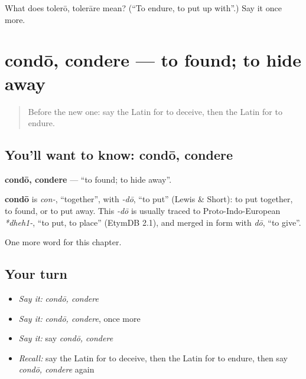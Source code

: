 \begin{tcolorbox}[breakable,colback=teal!4,colframe=teal!35!black,title={Before you move on}]
What does tolerō, tolerāre mean? (\textquotedblleft{}To endure, to put up with\textquotedblright{}.) Say it once more.
\end{tcolorbox}
\section[condō, condere]{condō, condere — to found; to hide away}

\label{lesson:LA-C171-condo}



\begin{quote}
Before the new one: say the Latin for to deceive, then the Latin for to endure.
\end{quote}

\subsection*{You'll want to know: condō, condere}
\textbf{condō, condere} — \textquotedblleft{}to found; to hide away\textquotedblright{}.

\begin{cousinweb}
\textbf{condō} is \emph{con-}, \textquotedblleft{}together\textquotedblright{}, with \emph{-dō}, \textquotedblleft{}to put\textquotedblright{} (Lewis \& Short): to put together, to found, or to put away. This \emph{-dō} is usually traced to Proto-Indo-European \emph{*dheh1-}, \textquotedblleft{}to put, to place\textquotedblright{} (EtymDB 2.1), and merged in form with \emph{dō}, \textquotedblleft{}to give\textquotedblright{}.
\end{cousinweb}

\begin{grammarlens}[title={What you've built}]
One more word for this chapter.
\end{grammarlens}

\subsection*{Your turn}
\begin{itemize}
\raggedright
  \item \emph{Say it:} \emph{condō, condere}
  \item \emph{Say it:} \emph{condō, condere}, once more
  \item \emph{Say it:} say \emph{condō, condere}
  \item \emph{Recall:} say the Latin for to deceive, then the Latin for to endure, then say \emph{condō, condere} again
\end{itemize}

